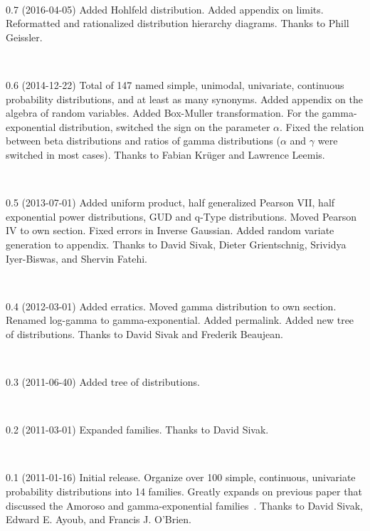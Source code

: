 {~

0.7 (2016-04-05) 
%
Added Hohlfeld distribution. %
Added appendix on limits.
Reformatted and rationalized distribution hierarchy diagrams. 
Thanks to Phill Geissler.

~

0.6 (2014-12-22)
%
Total of 147 named simple, unimodal, univariate, continuous probability distributions, and at least as many synonyms.
Added appendix on the algebra of random variables.
Added Box-Muller transformation.
For the gamma-exponential distribution, switched the sign on the parameter $\alpha$.
Fixed the relation between beta distributions and ratios of gamma distributions ($\alpha$ and $\gamma$ were switched in most cases).
Thanks to Fabian Kr\"uger and Lawrence Leemis.


~


0.5 (2013-07-01)
Added uniform product, half generalized Pearson VII, half exponential power distributions, GUD and q-Type distributions. 
Moved Pearson IV to own section.
Fixed errors in Inverse Gaussian.
Added random variate generation to appendix.
Thanks to David Sivak, Dieter Grientschnig, Srividya Iyer-Biswas, and Shervin Fatehi.

~

 0.4 (2012-03-01) 
Added erratics. 
Moved gamma distribution to own section.
Renamed log-gamma to gamma-exponential.
Added permalink.
Added new tree of distributions. 
Thanks to David Sivak and Frederik Beaujean.

~

0.3 (2011-06-40) 
Added tree of distributions. 

~

0.2 (2011-03-01) 
Expanded families.  
Thanks to David Sivak. 

~

 0.1 (2011-01-16)
 Initial release. Organize over 100  simple, continuous, univariate probability distributions into 14 families. Greatly expands on previous paper that discussed the Amoroso and gamma-exponential families~\cite{_amoroso}. Thanks to David Sivak, Edward E. Ayoub, and Francis J. O'Brien.

}



